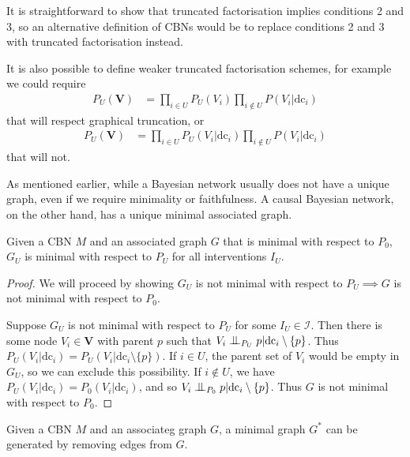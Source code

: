 \begin{remark}
It is straightforward to show that truncated factorisation implies conditions 2 and 3, so an alternative definition of CBNs would be to replace conditions 2 and 3 with truncated factorisation instead.

It is also possible to define weaker truncated factorisation schemes, for example we could require 
\begin{align}
    P_U(\mathbf{V})  &=  \prod_{i\in U} P_U(V_i) \prod_{i\not \in U} P(V_i|\mathrm{dc}_i)
\end{align}
that will respect graphical truncation, or
\begin{align}
    P_U(\mathbf{V})  &=  \prod_{i\in U} P_U(V_i|\mathrm{dc}_i) \prod_{i\not \in U} P(V_i|\mathrm{dc}_i)
\end{align}
that will not.
\end{remark}

As mentioned earlier, while a Bayesian network usually does not have a unique graph, even if we require minimality or faithfulness. A causal Bayesian network, on the other hand, has a unique minimal associated graph.

\begin{lemma}\label{lem:universal_minimality}
Given a CBN $M$ and an associated graph $G$ that is minimal with respect to $P_0$, $G_U$ is minimal with respect to $P_U$ for all interventions $I_U$.
\end{lemma}

\begin{proof}
We will proceed by showing $G_U$ is not minimal with respect to $P_U \implies G$ is not minimal with respect to $P_0$.

Suppose $G_U$ is not minimal with respect to $P_U$ for some $I_U\in\mathcal{I}$. Then there is some node $V_i\in \mathbf{V}$ with parent $p$ such that $V_i \CI_{P_U} p | \mathrm{dc}_i\setminus \{p\}$. Thus $P_U(V_i|\mathrm{dc}_i) = P_U(V_i|\mathrm{dc}_i\setminus \{p\})$. If $i\in U$, the parent set of $V_i$ would be empty in $G_U$, so we can exclude this possibility. If $i\not \in U$, we have $P_U(V_i|\mathrm{dc}_i)=P_0(V_i|\mathrm{dc}_i)$, and so $V_i\CI_{P_0} p|\mathrm{dc}_i\setminus \{p\}$. Thus $G$ is not minimal with respect to $P_0$.
\end{proof}

\begin{lemma}\label{lem:reduction_minimal}
Given a CBN $M$ and an associateg graph $G$, a minimal graph $G^*$ can be generated by removing edges from $G$.
\end{lemma}

